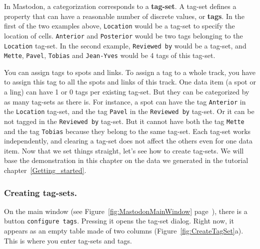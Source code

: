 In Mastodon, a categorization corresponds to a \textbf{tag-set}.
A tag-set defines a property that can have a reasonable number of discrete values, or \textbf{tags}.
In the first of the two examples above, \texttt{Location} would be a tag-set to specify the location of cells.
\texttt{Anterior} and \texttt{Posterior} would be two tags belonging to the \texttt{Location} tag-set.
In the second example, \texttt{Reviewed by} would be a tag-set, and \texttt{Mette}, \texttt{Pavel}, \texttt{Tobias} and \texttt{Jean-Yves} would be 4 tags of this tag-set.

You can assign tags to spots and links.
To assign a tag to a whole track, you have to assign this tag to all the spots and links of this track.
One data item (a spot or a ling) can have 1 or 0 tags per existing tag-set.
But they can be categorized by as many tag-sets as there is.
For instance, a spot can have the tag \texttt{Anterior} in the \texttt{Location} tag-set, and the tag \texttt{Pavel} in the \texttt{Reviewed by} tag-set. 
Or it can be not tagged in the \texttt{Reviewed by} tag-set.
But it cannot have both the tag \texttt{Mette} and the tag \texttt{Tobias} because they belong to the same tag-set.
Each tag-set works independently, and clearing a tag-set does not affect the others even for one data item.
Now that we set things straight, let's see how to create tag-sets.
We will base the demonstration in this chapter on the data we generated in the tutorial chapter~\ref{Getting_started}.


\subsubsection{Creating tag-sets.}

On the main window (see Figure~\ref{fig:MastodonMainWindow} page~\pageref{fig:MastodonMainWindow}), there is a button \texttt{configure tags}. 
Pressing it opens the tag-set dialog. 
Right now, it appears as an empty table made of two columns (Figure~\ref{fig:CreateTagSet}a). 
This is where you enter tag-sets and tags.

